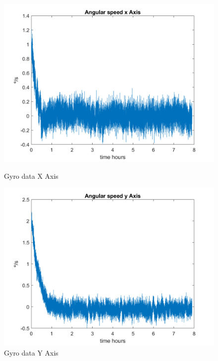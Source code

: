 \begin{itemize}
    \begin{figure}[H]
        \centering
        \begin{minipage}{0.32\linewidth}
            \centering
            \includegraphics[width=0.95\linewidth]{res/img/Nadir_no_EKF/Gyro data X Axis.png}
            \caption{Gyro data X Axis}
            \label{fig:GyroDataX}
        \end{minipage}\hfill
        \begin{minipage}{0.32\linewidth}
            \centering
            \includegraphics[width=0.95\linewidth]{res/img/Nadir_no_EKF/Gyro data Y Axis.png}
            \caption{Gyro data Y Axis}
            \label{fig:GyroDataY}
        \end{minipage}\hfill
        \begin{minipage}{0.32\linewidth}

\end{minipage}
\end{figure}
\end{itemize}
